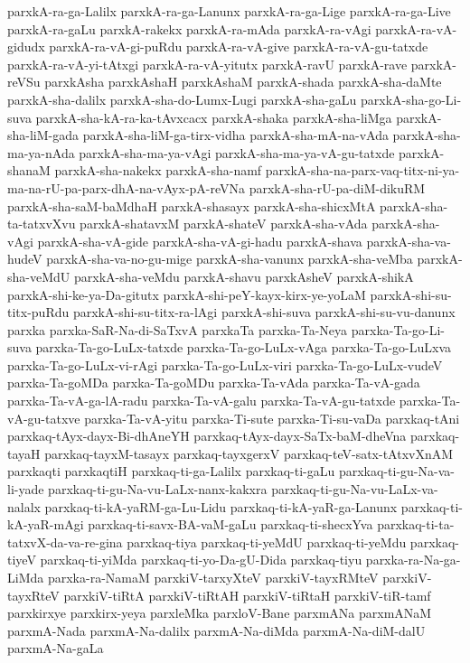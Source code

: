 {parxkA-ra-ga-Lalilx
parxkA-ra-ga-Lanunx
parxkA-ra-ga-Lige
parxkA-ra-ga-Live
parxkA-ra-gaLu
parxkA-rakekx
parxkA-ra-mAda
parxkA-ra-vAgi
parxkA-ra-vA-gidudx
parxkA-ra-vA-gi-puRdu
parxkA-ra-vA-give
parxkA-ra-vA-gu-tatxde
parxkA-ra-vA-yi-tAtxgi
parxkA-ra-vA-yitutx
parxkA-ravU
parxkA-rave
parxkA-reVSu
parxkAsha
parxkAshaH
parxkAshaM
parxkA-shada
parxkA-sha-daMte
parxkA-sha-dalilx
parxkA-sha-do-Lumx-Lugi
parxkA-sha-gaLu
parxkA-sha-go-Li-suva
parxkA-sha-kA-ra-ka-tAvxcacx
parxkA-shaka
parxkA-sha-liMga
parxkA-sha-liM-gada
parxkA-sha-liM-ga-tirx-vidha
parxkA-sha-mA-na-vAda
parxkA-sha-ma-ya-nAda
parxkA-sha-ma-ya-vAgi
parxkA-sha-ma-ya-vA-gu-tatxde
parxkA-shanaM
parxkA-sha-nakekx
parxkA-sha-namf
parxkA-sha-na-parx-vaq-titx-ni-ya-ma-na-rU-pa-parx-dhA-na-vAyx-pA-reVNa
parxkA-sha-rU-pa-diM-dikuRM
parxkA-sha-saM-baMdhaH
parxkA-shasayx
parxkA-sha-shicxMtA
parxkA-sha-ta-tatxvXvu
parxkA-shatavxM
parxkA-shateV
parxkA-sha-vAda
parxkA-sha-vAgi
parxkA-sha-vA-gide
parxkA-sha-vA-gi-hadu
parxkA-shava
parxkA-sha-va-hudeV
parxkA-sha-va-no-gu-mige
parxkA-sha-vanunx
parxkA-sha-veMba
parxkA-sha-veMdU
parxkA-sha-veMdu
parxkA-shavu
parxkAsheV
parxkA-shikA
parxkA-shi-ke-ya-Da-gitutx
parxkA-shi-peY-kayx-kirx-ye-yoLaM
parxkA-shi-su-titx-puRdu
parxkA-shi-su-titx-ra-lAgi
parxkA-shi-suva
parxkA-shi-su-vu-danunx
parxka
parxka-SaR-Na-di-SaTxvA
parxkaTa
parxka-Ta-Neya
parxka-Ta-go-Li-suva
parxka-Ta-go-LuLx-tatxde
parxka-Ta-go-LuLx-vAga
parxka-Ta-go-LuLxva
parxka-Ta-go-LuLx-vi-rAgi
parxka-Ta-go-LuLx-viri
parxka-Ta-go-LuLx-vudeV
parxka-Ta-goMDa
parxka-Ta-goMDu
parxka-Ta-vAda
parxka-Ta-vA-gada
parxka-Ta-vA-ga-lA-radu
parxka-Ta-vA-galu
parxka-Ta-vA-gu-tatxde
parxka-Ta-vA-gu-tatxve
parxka-Ta-vA-yitu
parxka-Ti-sute
parxka-Ti-su-vaDa
parxkaq-tAni
parxkaq-tAyx-dayx-Bi-dhAneYH
parxkaq-tAyx-dayx-SaTx-baM-dheVna
parxkaq-tayaH
parxkaq-tayxM-tasayx
parxkaq-tayxgerxV
parxkaq-teV-satx-tAtxvXnAM
parxkaqti
parxkaqtiH
parxkaq-ti-ga-Lalilx
parxkaq-ti-gaLu
parxkaq-ti-gu-Na-va-li-yade
parxkaq-ti-gu-Na-vu-LaLx-nanx-kakxra
parxkaq-ti-gu-Na-vu-LaLx-va-nalalx
parxkaq-ti-kA-yaRM-ga-Lu-Lidu
parxkaq-ti-kA-yaR-ga-Lanunx
parxkaq-ti-kA-yaR-mAgi
parxkaq-ti-savx-BA-vaM-gaLu
parxkaq-ti-shecxYva
parxkaq-ti-ta-tatxvX-da-va-re-gina
parxkaq-tiya
parxkaq-ti-yeMdU
parxkaq-ti-yeMdu
parxkaq-tiyeV
parxkaq-ti-yiMda
parxkaq-ti-yo-Da-gU-Dida
parxkaq-tiyu
parxka-ra-Na-ga-LiMda
parxka-ra-NamaM
parxkiV-tarxyXteV
parxkiV-tayxRMteV
parxkiV-tayxRteV
parxkiV-tiRtA
parxkiV-tiRtAH
parxkiV-tiRtaH
parxkiV-tiR-tamf
parxkirxye
parxkirx-yeya
parxleMka
parxloV-Bane
parxmANa
parxmANaM
parxmA-Nada
parxmA-Na-dalilx
parxmA-Na-diMda
parxmA-Na-diM-dalU
parxmA-Na-gaLa
}
